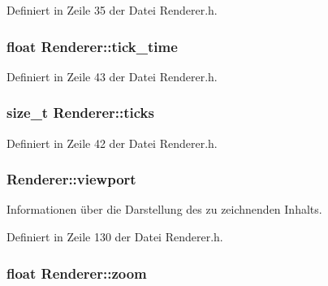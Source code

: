 Definiert in Zeile 35 der Datei Renderer.\-h.

\hypertarget{classRenderer_ae6aeda3bc0a4dc5f11d585b91cce3403}{
\subsubsection[{tick\-\_\-time}]{\setlength{\rightskip}{0pt plus 5cm}float Renderer\-::tick\-\_\-time\hspace{0.3cm}{\ttfamily [private]}}}\label{classRenderer_ae6aeda3bc0a4dc5f11d585b91cce3403}


Definiert in Zeile 43 der Datei Renderer.\-h.

\hypertarget{classRenderer_a4b7039dc3e7a9df5198267eb6ff4caa8}{
\subsubsection[{ticks}]{\setlength{\rightskip}{0pt plus 5cm}size\-\_\-t Renderer\-::ticks\hspace{0.3cm}{\ttfamily [private]}}}\label{classRenderer_a4b7039dc3e7a9df5198267eb6ff4caa8}


Definiert in Zeile 42 der Datei Renderer.\-h.

\hypertarget{classRenderer_a4428a5ef0ceaf4de5c9991a40990994d}{
\subsubsection[{viewport}]{ Renderer\-::viewport\hspace{0.3cm}{\ttfamily [private]}}}\label{classRenderer_a4428a5ef0ceaf4de5c9991a40990994d}


Informationen über die Darstellung des zu zeichnenden Inhalts. 



Definiert in Zeile 130 der Datei Renderer.\-h.

\hypertarget{classRenderer_a19f3325f9fa795e3f0971d4135f22c18}{
\subsubsection[{zoom}]{\setlength{\rightskip}{0pt plus 5cm}float Renderer\-::zoom}}\label{classRenderer_a19f3325f9fa795e3f0971d4135f22c18}


